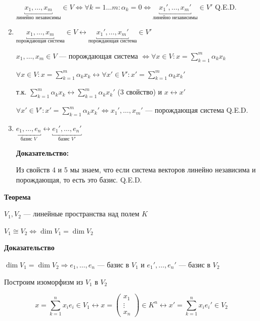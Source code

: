 \documentclass[twoside]{book}
\begin{document}
\begin{enumerate}
          \(\underbracket{x_1, \ldots
              , x_m}_{\text{линейно независимы}} \in V \Leftrightarrow \forall k = 1 \ldots m: \alpha_k = 0 \Leftrightarrow \underbracket{x_1', \ldots
              , x_m'}_{\text{линейно независимы}} \in V'\)
          \hfill Q.E.D.

    \item \(\underbracket{x_1, \ldots
              , x_m}_{\text{порождающая система}} \in V \longleftrightarrow \underbracket{x_1', \ldots, x_m'}_{\text{порождающая система}} \in V'\)

          \(x_1, \ldots, x_m \in V\) --- порождающая система \(\Leftrightarrow \forall x \in V: x = \sum\limits_{k = 1}^{m} \alpha_k x_k\)

          \(\forall x \in V: x = \sum\limits_{k = 1}^{m} \alpha_k x_k \longleftrightarrow \forall x' \in V': x' = \sum\limits_{k = 1}^{m} \alpha_k x_k'\)

          т.к. \(\sum\limits_{k = 1}^{m} \alpha_k x_k \longleftrightarrow \sum\limits_{k = 1}^{m} \alpha_k x_k'\) (3 свойство) и \(x \longleftrightarrow x'\)

          \(\forall x' \in V': x' = \sum\limits_{k = 1}^{m} \alpha_k x_k' \Leftrightarrow x_1', \ldots, x_m'\) --- порождающая система
          \hfill Q.E.D.

    \item \(\underbracket{e_1, \ldots, e_n}_{\text{базис } V} \longleftrightarrow \underbracket{e_1', \ldots, e_n'}_{\text{базис } V'}\)

          \textbf{Доказательство:}

          Из свойств 4 и 5 мы знаем, что если система векторов линейно независима и порождающая, то есть это базис.
          \hfill Q.E.D.
\end{enumerate}

\textbf{Теорема}

\(V_1, V_2\) --- линейные пространства над полем \(K\)

\(V_1 \cong V_2 \Leftrightarrow \dim V_1 = \dim V_2\)

\textbf{Доказательство}

\fbox{\(\Leftarrow\)}
\(\dim V_1 = \dim V_2 \Rightarrow e_1, \ldots, e_n\) --- базис в \(V_1\) и \(e_1', \ldots, e_n'\) --- базис в \(V_2\)

Построим изоморфизм из \(V_1\) в \(V_2\)


\[
    x = \sum\limits_{k = 1}^{n} x_i e_i \in V_1 \longleftrightarrow x = \begin{pmatrix}
        x_{1}  \\
        \vdots \\
        x_{n}
    \end{pmatrix} \in K^n \longleftrightarrow x' = \sum\limits_{k = 1}^{n} x_i e_i' \in V_2
\]
\end{document}
